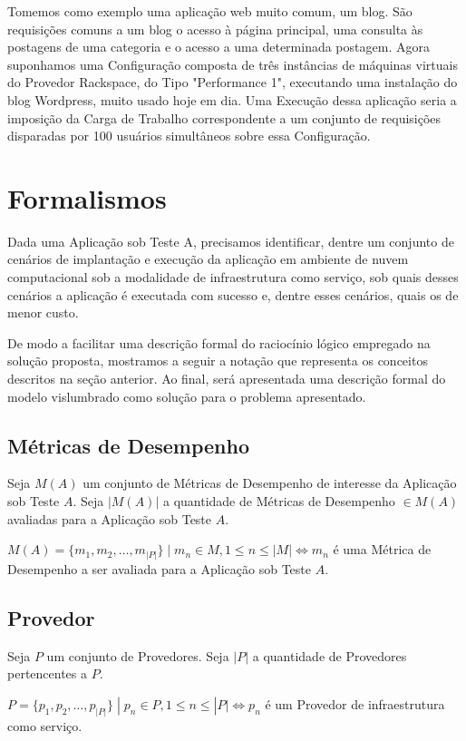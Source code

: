 Tomemos como exemplo uma aplicação web muito comum, um blog. São requisições 
comuns a um blog o acesso à página principal, uma consulta às postagens de uma
categoria e o acesso a uma determinada postagem. Agora suponhamos uma Configuração
composta de três instâncias de máquinas virtuais do Provedor Rackspace, do Tipo 
"Performance 1", executando uma instalação do blog Wordpress, muito usado hoje em 
dia. Uma Execução dessa aplicação seria a imposição da Carga de Trabalho correspondente
a um conjunto de requisições disparadas por 100 usuários simultâneos sobre essa Configuração. 

\section{Formalismos}
Dada uma Aplicação sob Teste A, precisamos identificar, dentre um conjunto de 
cenários de implantação e execução da aplicação em ambiente de nuvem 
computacional sob a modalidade de infraestrutura como serviço, sob quais desses 
cenários a aplicação é executada com sucesso e, dentre esses cenários, quais os 
de menor custo.

De modo a facilitar uma descrição formal do raciocínio lógico empregado na
solução proposta, mostramos a seguir a notação que representa os conceitos 
descritos na seção anterior. Ao final, será apresentada uma descrição formal
do modelo vislumbrado como solução para o problema apresentado.

\subsection{Métricas de Desempenho}
Seja $M(A)$ um conjunto de Métricas de Desempenho de interesse da Aplicação sob 
Teste $A$. Seja $|M(A)|$ a quantidade de Métricas de Desempenho $\in M(A)$ avaliadas 
para a Aplicação sob Teste $A$.

$M(A) = \{m_1, m_2, \dotsc, m_{|P|}\}\; | \; m_n \in M, 1 \leq n \leq |M| \iff m_n $ 
é uma Métrica de Desempenho a ser avaliada para a Aplicação sob Teste $A$.

\subsection{Provedor}
Seja $P$ um conjunto de Provedores. Seja $|P|$ a quantidade de Provedores 
pertencentes a $P$.

$P = \{p_1, p_2, \dotsc, p_{|P|}\}\; | \; p_n \in P, 1 \leq n \leq |P| \iff p_n $ 
é um Provedor de infraestrutura como serviço.

